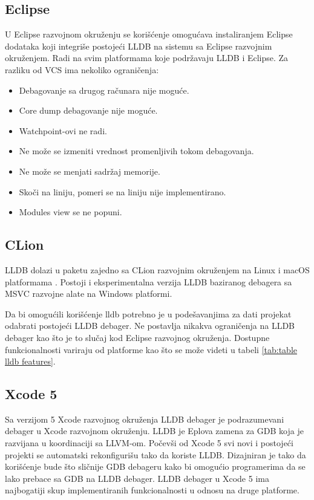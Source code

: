 \documentclass[a4paper]{article}
\begin{document}
\subsection*{Eclipse}
U Eclipse razvojnom okruženju se korišćenje omogućava instaliranjem Eclipse dodataka \cite{eclipse_plugin} koji integriše postojeći LLDB na sistemu sa Eclipse razvojnim okruženjem. Radi na svim platformama koje podržavaju LLDB i Eclipse. Za razliku od VCS ima nekoliko ograničenja:

\begin{itemize}
\item Debagovanje sa drugog računara nije moguće.
\item Core dump debagovanje nije moguće.
\item Watchpoint-ovi ne radi.
\item Ne može se izmeniti vrednost promenljivih tokom debagovanja.
\item Ne može se menjati sadržaj memorije.
\item Skoči na liniju, pomeri se na liniju nije implementirano.
\item Modules view se ne popuni.
\end{itemize}

\subsection*{CLion}
LLDB dolazi u paketu zajedno sa CLion razvojnim okruženjem na Linux i macOS platformama \cite{clion_lldb}. Postoji i eksperimentalna verzija LLDB baziranog debagera sa MSVC razvojne alate na Windows platformi.

Da bi omogućili korišćenje lldb potrebno je u podešavanjima za dati projekat odabrati postojeći LLDB debager. 
Ne postavlja nikakva ograničenja na LLDB debager kao što je to slučaj kod Eclipse razvojnog okruženja.
Dostupne funkcionalnosti variraju od platforme kao što se može videti u tabeli \ref{tab:table lldb features}.

\subsection*{Xcode 5}
Sa verzijom 5 Xcode razvojnog okruženja LLDB debager je podrazumevani debager u Xcode razvojnom okruženju. LLDB je Eplova zamena za GDB koja je razvijana u koordinaciji sa LLVM-om. Počevši od Xcode 5 svi novi i postojeći projekti se automatski rekonfigurišu tako da koriste LLDB. Dizajniran je tako da korišćenje bude što sličnije GDB debageru kako bi omogućio programerima da se lako prebace sa GDB na LLDB debager. LLDB debager u Xcode 5 ima najbogatiji skup implementiranih funkcionalnosti u odnosu na druge platforme.
\end{document}
